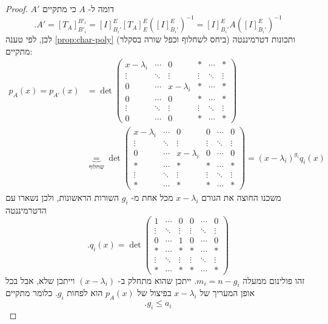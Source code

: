 \documentclass[12pt]{report}
\theoremstyle{plain}
\theoremstyle{definition}
\newcommand{\0}{\mathbf{0}}
\begin{document}
\begin{proof}
$A'$
דומה ל-
$A$
כי מתקיים
$$
.A'=[T_A]_{B'_i}^{B'_i}=[I]_{B_i'}^E[T_A]_E^E([I]_{B_i'}^E)^{-1}=[I]_{B_i'}^EA([I]_{B_i'}^E)^{-1}
$$
לכן, לפי טענה
\ref{prop:char-poly}
ותכונות דטרמיננטה (ביחס לשחלוף וכפל שורה בסקלר) מתקיים:
$$
\begin{aligned}
p_A(x)=p_{A'}(x)&=\det\begin{pmatrix}
x-\lambda_i & \cdots & 0 & * & \cdots & * \\
\vdots & \ddots & \vdots & \vdots &\ddots & \vdots \\
0 & \cdots & x-\lambda_i & * & \cdots & * \\
0 & \cdots & 0 & * & \cdots & * \\
\vdots & \ddots & \vdots & \vdots &\ddots & \vdots \\
0 & \cdots & 0 & * & \cdots & *
\end{pmatrix} \\
&\underbrace{=}_{\text{שחלוף}}\det\begin{pmatrix}
x-\lambda_i & \cdots & 0 & 0 & \cdots & 0 \\
\vdots & \ddots & \vdots & \vdots &\ddots & \vdots \\
0 & \cdots & x-\lambda_i & 0 & \cdots & 0 \\
* & \cdots & * & * & \cdots & * \\
\vdots & \ddots & \vdots & \vdots &\ddots & \vdots \\
* & \cdots & * & * & \cdots & *
\end{pmatrix}=(x-\lambda_i)^{g_i}q_i(x)
\end{aligned}
$$
משכנו החוצה את הגורם
$x-\lambda_i$
מכל אחת מ-
$g_i$
השורות הראשונות, ולכן נשארו עם הדטרמיננטה
$$
.q_i(x)=\det\begin{pmatrix}
1 & \cdots & 0 & 0 & \cdots & 0 \\
\vdots & \ddots & \vdots & \vdots &\ddots & \vdots \\
0 & \cdots & 1 & 0 & \cdots & 0 \\
* & \cdots & * & * & \cdots & * \\
\vdots & \ddots & \vdots & \vdots &\ddots & \vdots \\
* & \cdots & * & * & \cdots & *
\end{pmatrix}
$$
זהו פולינום ממעלה
$m_i=n-g_i$.
ייתכן שהוא מתחלק ב-
$(x-\lambda_i)$
וייתכן שלא, אבל בכל אופן המעריך של 
$x-\lambda_i$
בפיצול של
$p_A(x)$
הוא לפחות 
$g_i$.
כלומר מתקיים
$$
.g_i\leq a_i
$$

\end{proof}
\end{document}
